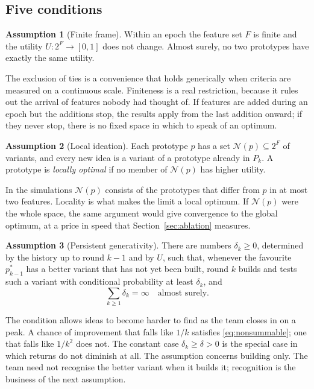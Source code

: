\documentclass[10pt,twocolumn]{article}
\newcommand{\Nb}{\mathcal{N}}
\newcommand{\Pk}{P_k}
\theoremstyle{definition}
\newtheorem{assumption}{Assumption}
\begin{document}
\subsection{Five conditions}

\begin{assumption}[Finite frame]
\label{as:finite}
Within an epoch the feature set $F$ is finite and the utility $U:2^F\to[0,1]$ does not change. Almost surely, no two prototypes have exactly the same utility.
\end{assumption}

The exclusion of ties is a convenience that holds generically when criteria are measured on a continuous scale. Finiteness is a real restriction, because it rules out the arrival of features nobody had thought of. If features are added during an epoch but the additions stop, the results apply from the last addition onward; if they never stop, there is no fixed space in which to speak of an optimum.

\begin{assumption}[Local ideation]
\label{as:local}
Each prototype $p$ has a set $\Nb(p)\subseteq 2^F$ of variants, and every new idea is a variant of a prototype already in $\Pk$. A prototype is \emph{locally optimal} if no member of $\Nb(p)$ has higher utility.
\end{assumption}

In the simulations $\Nb(p)$ consists of the prototypes that differ from $p$ in at most two features. Locality is what makes the limit a local optimum. If $\Nb(p)$ were the whole space, the same argument would give convergence to the global optimum, at a price in speed that Section~\ref{sec:ablation} measures.

\begin{assumption}[Persistent generativity]
\label{as:gen}
There are numbers $\delta_k\ge0$, determined by the history up to round $k-1$ and by $U$, such that, whenever the favourite $p^*_{k-1}$ has a better variant that has not yet been built, round $k$ builds and tests such a variant with conditional probability at least $\delta_k$, and
\begin{equation}
\label{eq:nonsummable}
\sum_{k\ge1}\delta_k=\infty\quad\text{almost surely.}
\end{equation}
\end{assumption}

The condition allows ideas to become harder to find as the team closes in on a peak. A chance of improvement that falls like $1/k$ satisfies \eqref{eq:nonsummable}; one that falls like $1/k^2$ does not. The constant case $\delta_k\ge\delta>0$ is the special case in which returns do not diminish at all. The assumption concerns building only. The team need not recognise the better variant when it builds it; recognition is the business of the next assumption.
\end{document}
